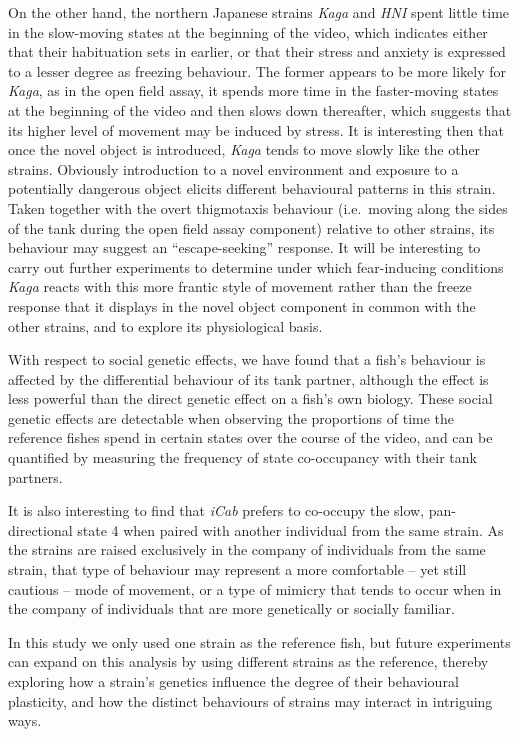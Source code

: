 \documentclass[
]{book}
\begin{document}
On the other hand, the northern Japanese strains \emph{Kaga} and \emph{HNI} spent little time in the slow-moving states at the beginning of the video, which indicates either that their habituation sets in earlier, or that their stress and anxiety is expressed to a lesser degree as freezing behaviour. The former appears to be more likely for \emph{Kaga}, as in the open field assay, it spends more time in the faster-moving states at the beginning of the video and then slows down thereafter, which suggests that its higher level of movement may be induced by stress. It is interesting then that once the novel object is introduced, \emph{Kaga} tends to move slowly like the other strains. Obviously introduction to a novel environment and exposure to a potentially dangerous object elicits different behavioural patterns in this strain. Taken together with the overt thigmotaxis behaviour (i.e.~moving along the sides of the tank during the open field assay component) relative to other strains, its behaviour may suggest an ``escape-seeking'' response. It will be interesting to carry out further experiments to determine under which fear-inducing conditions \emph{Kaga} reacts with this more frantic style of movement rather than the freeze response that it displays in the novel object component in common with the other strains, and to explore its physiological basis.

With respect to social genetic effects, we have found that a fish's behaviour is affected by the differential behaviour of its tank partner, although the effect is less powerful than the direct genetic effect on a fish's own biology. These social genetic effects are detectable when observing the proportions of time the reference fishes spend in certain states over the course of the video, and can be quantified by measuring the frequency of state co-occupancy with their tank partners.

It is also interesting to find that \emph{iCab} prefers to co-occupy the slow, pan-directional state 4 when paired with another individual from the same strain. As the strains are raised exclusively in the company of individuals from the same strain, that type of behaviour may represent a more comfortable -- yet still cautious -- mode of movement, or a type of mimicry that tends to occur when in the company of individuals that are more genetically or socially familiar.

In this study we only used one strain as the reference fish, but future experiments can expand on this analysis by using different strains as the reference, thereby exploring how a strain's genetics influence the degree of their behavioural plasticity, and how the distinct behaviours of strains may interact in intriguing ways.
\end{document}
